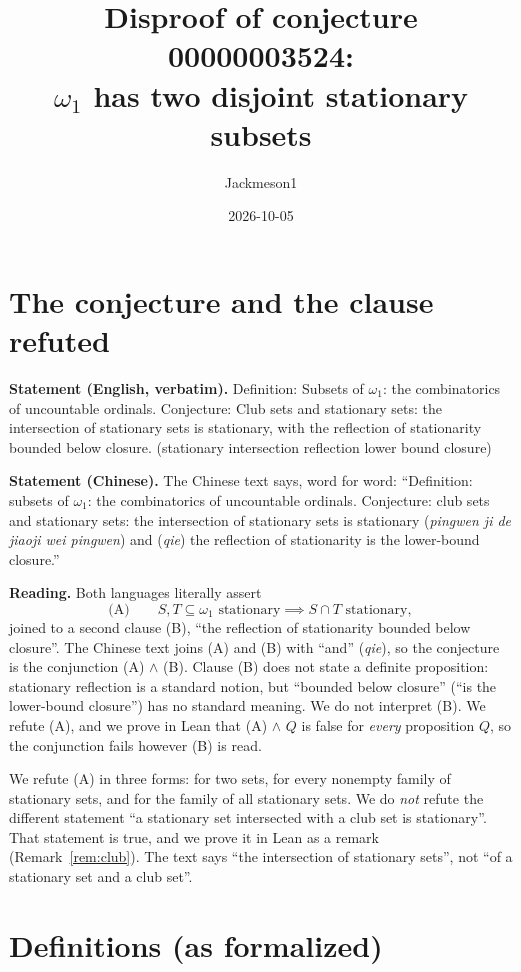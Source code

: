 \documentclass[11pt]{article}
\title{Disproof of conjecture 00000003524:\\ $\omega_1$ has two disjoint stationary subsets}
\author{Jackmeson1}
\date{2026-10-05}
\theoremstyle{definition}
\theoremstyle{remark}
\begin{document}
\maketitle

\section{The conjecture and the clause refuted}

\textbf{Statement (English, verbatim).} Definition: Subsets of $\omega_1$: the combinatorics of
uncountable ordinals. Conjecture: Club sets and stationary sets: the intersection of stationary
sets is stationary, with the reflection of stationarity bounded below closure. (stationary
intersection reflection lower bound closure)

\textbf{Statement (Chinese).} The Chinese text says, word for word: ``Definition: subsets of
$\omega_1$: the combinatorics of uncountable ordinals. Conjecture: club sets and stationary sets:
the intersection of stationary sets is stationary (\emph{pingwen ji de jiaoji wei pingwen}) and
(\emph{qie}) the reflection of stationarity is the lower-bound closure.''

\textbf{Reading.} Both languages literally assert
\[
  \text{(A)}\qquad S, T \subseteq \omega_1 \text{ stationary} \implies S\cap T \text{ stationary},
\]
joined to a second clause (B), ``the reflection of stationarity bounded below closure''. The
Chinese text joins (A) and (B) with ``and'' (\emph{qie}), so the conjecture is the conjunction
(A) $\wedge$ (B). Clause (B) does not state a definite proposition: stationary reflection is a
standard notion, but ``bounded below closure'' (``is the lower-bound closure'') has no standard
meaning. We do not interpret (B). We refute (A), and we prove in Lean that (A) $\wedge$ $Q$ is
false for \emph{every} proposition $Q$, so the conjunction fails however (B) is read.

We refute (A) in three forms: for two sets, for every nonempty family of stationary sets, and
for the family of all stationary sets. We do \emph{not} refute the different statement ``a
stationary set intersected with a club set is stationary''. That statement is true, and we
prove it in Lean as a remark (Remark~\ref{rem:club}). The text says ``the intersection of
stationary sets'', not ``of a stationary set and a club set''.

\section{Definitions (as formalized)}
\end{document}
